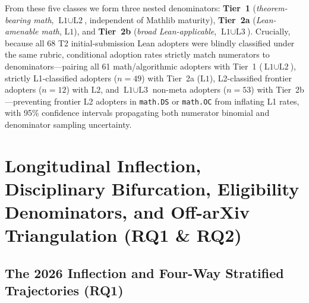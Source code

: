 \documentclass[11pt,letterpaper]{article}
\begin{document}
\begin{enumerate}
\end{enumerate}

From these five classes we form three nested denominators: \textbf{Tier~1} (\emph{theorem-bearing math}, $\text{L1} \cup \text{L2}$, independent of Mathlib maturity), \textbf{Tier~2a} (\emph{Lean-amenable math}, $\text{L1}$), and \textbf{Tier~2b} (\emph{broad Lean-applicable}, $\text{L1} \cup \text{L3}$). Crucially, because all 68 T2 initial-submission Lean adopters were blindly classified under the same rubric, conditional adoption rates strictly match numerators to denominators---pairing all 61 math/algorithmic adopters with Tier~1 ($\text{L1} \cup \text{L2}$), strictly L1-classified adopters ($n = 49$) with Tier~2a ($\text{L1}$), L2-classified frontier adopters ($n = 12$) with $\text{L2}$, and $\text{L1} \cup \text{L3}$ non-meta adopters ($n = 53$) with Tier~2b---preventing frontier L2 adopters in \texttt{math.DS} or \texttt{math.OC} from inflating L1 rates, with 95\% confidence intervals propagating both numerator binomial and denominator sampling uncertainty.

\section{Longitudinal Inflection, Disciplinary Bifurcation, Eligibility Denominators, and Off-arXiv Triangulation (RQ1 \& RQ2)}
\label{sec:longitudinal_and_cats}

\subsection{The 2026 Inflection and Four-Way Stratified Trajectories (RQ1)}
\label{sec:longitudinal}
\end{document}

